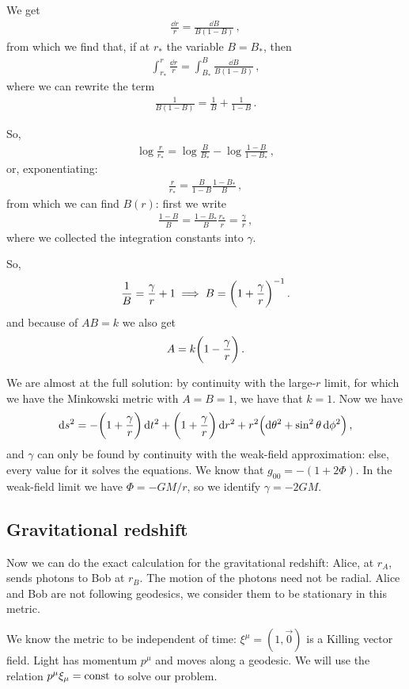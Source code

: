 \documentclass[main.tex]{subfiles}
\begin{document}
We get 
%
\begin{align}
  \frac{\dd{r}}{r} = \frac{ \dd{B}}{B(1-B)}
\,,
\end{align}
%
from which we find that, if at \(r_{*}\) the variable \(B = B_{*}\), then 
%
\begin{align}
    \int _{r_{*}}^{r}\frac{\dd{r}}{r} = 
    \int _{B_{*}}^{B}  \frac{ \dd{B}}{B(1-B)}
\,,
\end{align}
%
where we can rewrite the term 
%
\begin{align}
  \frac{1}{B(1-B)} = \frac{1}{B} + \frac{1}{1-B}
\,.
\end{align}

So, 
%
\begin{align}
  \log \frac{r}{r_{*}} = \log \frac{B}{B_{*}} - \log \frac{1-B}{1-B_{*}}
\,,
\end{align}
%
or, exponentiating: 
%
\begin{align}
  \frac{r}{r_{*}} = \frac{B}{1-B} \frac{1-B_{*}}{B}
\,,
\end{align}
%
from which we can find \(B(r)\): first we write 
%
\begin{align}
  \frac{1-B}{B} = \frac{1-B_{*}}{B} \frac{r_{*}}{r} = \frac{\gamma }{r}
\,,
\end{align}
%
where we collected the integration constants into \(\gamma \).

So, 
%
\begin{align}
  \frac{1}{B} = \frac{\gamma}{r} + 1 \implies B = \qty(1 + \frac{ \gamma }{r})^{-1}
\,.
\end{align}
%
and because of \(AB = k\) we also get 
%
\begin{align}
  A = k \qty(1 - \frac{\gamma}{r})
\,.
\end{align}

We are almost at the full solution: by continuity with the large-\(r\) limit, for which we have the Minkowski metric with \(A = B = 1\), we have that \(k=1\). Now we have 
%
\begin{align}
  \dd{s^2} = - \qty(1 + \frac{\gamma }{r}) \dd{t^2} 
  + \qty(1 + \frac{\gamma}{r}) \dd{r^2}
  + r^2 \qty(\dd{\theta^2} + \sin^2 \theta \dd{\phi^2})
\,,
\end{align}
%
and \(\gamma \) can only be found by continuity with the weak-field approximation: else, every value for it solves the equations. 
We know that \(g_{00} = - (1+2 \Phi )\).
In the weak-field limit we have \(\Phi = -GM/r\), so we identify \(\gamma = - 2GM\).

\subsection{Gravitational redshift}

Now we can do the exact calculation for the gravitational redshift:
Alice, at \(r_A\), sends photons to Bob at \(r_B\). The motion of the photons need not be radial.
Alice and Bob are not following geodesics, we consider them to be stationary in this metric.

We know the metric to be independent of time: \(\xi^{\mu } = (1,\vec{0})\) is a Killing vector field.
Light has momentum \(p^{\mu }\) and moves along a geodesic.
We will use the relation \(p^{\mu } \xi_{\mu } = \text{const}\) to solve our problem.
\end{document}
